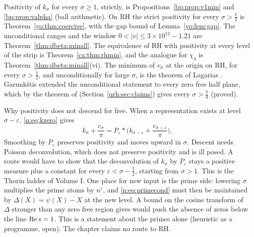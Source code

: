 Positivity of $k_\sigma$ for every $\sigma\ge1$, strictly, is Propositions~\ref{bp:prop:v1min} and \ref{bp:prop:valpha} (ball arithmetic). On RH the strict positivity for every $\sigma>\frac12$ is Theorem~\ref{yo:thm:coercive}, with the gap bound of Lemma~\ref{yo:lem:gap}. The unconditional ranges and the window $0<|v|\le3\times10^{12}-1.21$ are Theorem~\ref{thm:dbeta:minall}. The equivalence of RH with positivity at every level of the strip is Theorem~\ref{cx:thm:rhmin}, and the analogue for $\chi_4$ is Theorem~\ref{thm:dbeta:minall}(vi). The minimum of $v_\sigma$ at the origin on RH, for every $\sigma>\frac12$, and unconditionally for large $\sigma$, is the theorem of Lagarias \cite{Lagarias}. Garunk\v{s}tis \cite{Garunkstis02} extended the unconditional statement to every zero free half plane, which by the theorem of \cite{OAI26a} (Section~\ref{qrh:sec:claims}) gives every $\sigma>\frac78$ (proved).

Why positivity does not descend for free. When a representation exists at level $\sigma-\varepsilon$, \eqref{n:eq:kzero} gives
\[
k_\sigma+\frac{c_\sigma}\pi=P_\varepsilon*\Big(k_{\sigma-\varepsilon}+\frac{c_{\sigma-\varepsilon}}\pi\Big).
\]
Smoothing by $P_\varepsilon$ preserves positivity and moves upward in $\sigma$. Descent needs Poisson deconvolution, which does not preserve positivity and is ill posed. A route would have to show that the deconvolution of $k_\sigma$ by $P_\varepsilon$ stays a positive measure plus a constant for every $\varepsilon<\sigma-\frac12$, starting from $\sigma>1$. This is the Thorin ladder of Volume I. One place for new input is the prime side: lowering $\sigma$ multiplies the prime atoms by $n^\varepsilon$, and \eqref{n:eq:primecond} must then be maintained by $\Delta(X)=\psi(X)-X$ at the new level. A bound on the cosine transform of $\Delta$ stronger than any zero free region gives would push the absence of zeros below the line $\operatorname{Re} s=1$. This is a statement about the primes alone (heuristic as a programme, open). The chapter claims no route to RH.
